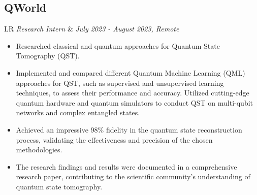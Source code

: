 \documentclass[11pt,a3paper]{moderncv}
\newcommand*{\experienceentry}[5][1.5mm]{
    \subsection{#2} \vspace{-1.5mm}
    \begin{tabularx}{\textwidth}{LR}
        {\itshape #3} & {\itshape #4, #5}
    \end{tabularx}
    \par\addvspace{#1}
}
\begin{document}
\begin{minipage}[t]{0.62\textwidth}
{\experienceentry{QWorld}{Research Intern}{July 2023 - August 2023}{Remote}
\begin{itemize}
    \item Researched classical and quantum approaches for Quantum State Tomography (QST).
    \item Implemented and compared different Quantum Machine Learning (QML) approaches for QST, such as supervised and unsupervised learning techniques, to assess their performance and accuracy. Utilized cutting-edge quantum hardware and quantum simulators to conduct QST on multi-qubit networks and complex entangled states.
    \item Achieved an impressive 98\% fidelity in the quantum state reconstruction process, validating the effectiveness and precision of the chosen methodologies.
    \item The research findings and results were documented in a comprehensive research paper, contributing to the scientific community's understanding of quantum state tomography.
\end{itemize}
\vspace{1.0mm}
}
\vspace{2.0mm}

\end{minipage}
\end{document}
